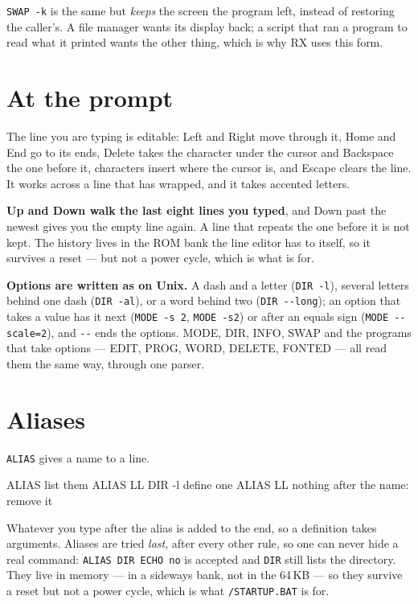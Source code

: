 \verb|SWAP -k| is the same but \emph{keeps} the screen the program left,
instead of restoring the caller's. A file manager wants its display
back; a script that ran a program to read what it printed wants the
other thing, which is why RX uses this form.

\section{At the prompt}
The line you are typing is editable: Left and Right move through it,
Home and End go to its ends, Delete takes the character under the cursor
and Backspace the one before it, characters insert where the cursor is,
and Escape clears the line. It works across a line that has wrapped, and
it takes accented letters.

\textbf{Up and Down walk the last eight lines you typed}, and Down past
the newest gives you the empty line again. A line that repeats the one
before it is not kept. The history lives in the ROM bank the line editor
has to itself, so it survives a reset --- but not a power cycle, which
is what  is for.

\textbf{Options are written as on Unix.} A dash and a letter
(\texttt{DIR -l}), several letters behind one dash (\texttt{DIR -al}),
or a word behind two (\texttt{DIR -{}-long}); an option that takes a
value has it next (\texttt{MODE -s 2}, \texttt{MODE -s2}) or after an
equals sign (\texttt{MODE -{}-scale=2}), and \texttt{-{}-} ends the
options. MODE, DIR, INFO, SWAP and the programs that take options ---
EDIT, PROG, WORD, DELETE, FONTED --- all read them the same way,
through one parser.

\section{Aliases}
\verb|ALIAS| gives a name to a line.

\begin{type}
ALIAS                    list them
ALIAS LL DIR -l          define one
ALIAS LL                 nothing after the name: remove it
\end{type}

Whatever you type after the alias is added to the end, so a definition
takes arguments. Aliases are tried \emph{last}, after every other rule, so
one can never hide a real command: \verb|ALIAS DIR ECHO no| is accepted
and \verb|DIR| still lists the directory. They live in memory --- in a
sideways bank, not in the 64\,KB --- so they survive a reset but not a
power cycle, which is what \verb|/STARTUP.BAT| is for.

